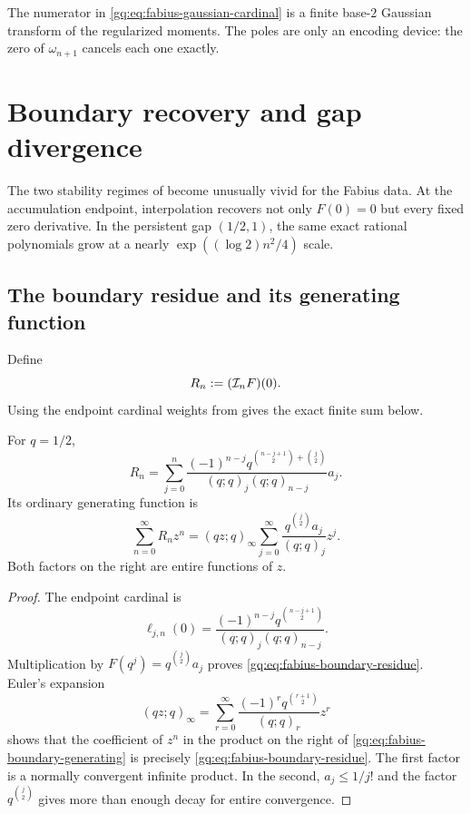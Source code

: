 The numerator in \eqref{gq:eq:fabius-gaussian-cardinal} is a finite base-$2$
Gaussian transform of the regularized moments.  The poles are only an
encoding device: the zero of $\omega_{n+1}$ cancels each one exactly.

\section{Boundary recovery and gap divergence}
\label{gq:chap:fabius-boundary-gap}

The two stability regimes of  become unusually vivid
for the Fabius data.  At the accumulation endpoint, interpolation recovers
not only $F(0)=0$ but every fixed zero derivative.  In the persistent gap
$(1/2,1)$, the same exact rational polynomials grow at a nearly
$\exp((\log2)n^2/4)$ scale.

\subsection{The boundary residue and its generating function}
\label{gq:sec:fabius-boundary-transform}

Define
\begin{equation}
 R_n:=(\mathcal I_nF)(0).
 \label{gq:eq:fabius-boundary-residue-definition}
\end{equation}
Using the endpoint cardinal weights from
 gives the exact finite sum below.

\begin{theorem}
\label{gq:thm:fabius-boundary-residue}
For $q=1/2$,
\begin{equation}
 \boxed{
 R_n=\sum_{j=0}^{n}
 \frac{(-1)^{n-j}
 q^{\binom{n-j+1}{2}+\binom j2}}
 {(q;q)_j(q;q)_{n-j}}a_j.}
 \label{gq:eq:fabius-boundary-residue}
\end{equation}
Its ordinary generating function is
\begin{equation}
 \boxed{
 \sum_{n=0}^{\infty}R_nz^n
 =(qz;q)_\infty
  \sum_{j=0}^{\infty}
  \frac{q^{\binom j2}a_j}{(q;q)_j}z^j.}
 \label{gq:eq:fabius-boundary-generating}
\end{equation}
Both factors on the right are entire functions of $z$.
\end{theorem}

\begin{proof}
The endpoint cardinal is
\[
 \ell_{j,n}(0)
 =\frac{(-1)^{n-j}q^{\binom{n-j+1}{2}}}
 {(q;q)_j(q;q)_{n-j}}.
\]
Multiplication by $F(q^j)=q^{\binom j2}a_j$ proves
\eqref{gq:eq:fabius-boundary-residue}.  Euler's expansion
\[
 (qz;q)_\infty
 =\sum_{r=0}^{\infty}
   \frac{(-1)^rq^{\binom{r+1}{2}}}{(q;q)_r}z^r
\]
shows that the coefficient of $z^n$ in the product on the right of
\eqref{gq:eq:fabius-boundary-generating} is precisely
\eqref{gq:eq:fabius-boundary-residue}.  The first factor is a normally
convergent infinite product.  In the second, $a_j\le1/j!$ and the factor
$q^{\binom j2}$ gives more than enough decay for entire convergence.
\end{proof}


